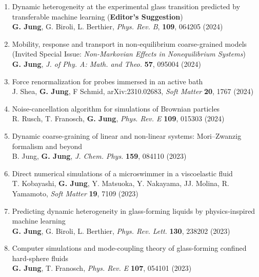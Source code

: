 \begin{enumerate}
	\item Dynamic heterogeneity at the experimental glass transition predicted by transferable machine learning (\textbf{Editor's Suggestion}) \\
	\textbf{G. Jung}, G. Biroli, L. Berthier,  \emph{Phys. Rev. B}, \textbf{109}, 064205 (2024)
	
	\item Mobility, response and transport in non-equilibrium coarse-grained models  (Invited Special Issue: \emph{Non-Markovian Effects in Nonequilibrium Systems})\\
	\textbf{G. Jung}, \emph{J. of Phy. A: Math. and Theo.} \textbf{57}, 095004 (2024) 
	
	\item Force renormalization for probes immersed in an active bath\\
	J. Shea, \textbf{G. Jung}, F Schmid, arXiv:2310.02683, \emph{Soft Matter} \textbf{20}, 1767 (2024)
	
	\item Noise-cancellation algorithm for simulations of Brownian particles\\
	R. Rusch, T. Franosch, \textbf{G. Jung}, \emph{Phys. Rev. E} \textbf{109}, 015303 (2024)
	
	\item Dynamic coarse-graining of linear and non-linear systems: Mori–Zwanzig formalism and beyond\\
	B. Jung, \textbf{G. Jung}, \emph{J. Chem. Phys.} \textbf{159}, 084110 (2023)
	
	\item Direct numerical simulations of a microswimmer in a viscoelastic fluid\\
	T. Kobayashi, \textbf{G. Jung}, Y. Matsuoka, Y. Nakayama, JJ. Molina, R. Yamamoto, \emph{Soft Matter} \textbf{19}, 7109 (2023)
	
	\item  Predicting dynamic heterogeneity in glass-forming liquids by physics-inspired machine learning\\
	\textbf{G. Jung}, G. Biroli, L. Berthier, \emph{Phys. Rev. Lett.} \textbf{130}, 238202 (2023) 
	
	\item  Computer simulations and mode-coupling theory of glass-forming confined hard-sphere fluids\\
	\textbf{G. Jung}, T. Franosch, \emph{Phys. Rev. E} \textbf{107}, 054101 (2023) 
	

\end{enumerate}
